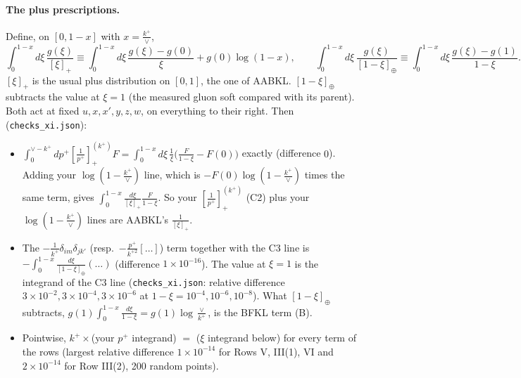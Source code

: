 \documentclass[9pt]{article}
\numberwithin{equation}{section}
\begin{document}
\paragraph{The plus prescriptions.} Define, on $[0,1-x]$ with $x=\frac{k^+}{\vee}$,
\begin{equation}
\int_0^{1-x}\!d\xi\,\frac{g(\xi)}{[\xi]_+}\equiv\int_0^{1-x}\!d\xi\,\frac{g(\xi)-g(0)}{\xi}+g(0)\log(1-x),\qquad
\int_0^{1-x}\!d\xi\,\frac{g(\xi)}{[1-\xi]_\oplus}\equiv\int_0^{1-x}\!d\xi\,\frac{g(\xi)-g(1)}{1-\xi}.
\end{equation}
$[\xi]_+$ is the usual plus distribution on $[0,1]$, the one of AABKL. $[1-\xi]_\oplus$ subtracts the value at $\xi=1$ (the measured gluon soft compared with its parent). Both act at fixed $u,x,x',y,z,w$, on everything to their right. Then (\texttt{checks\_xi.json}):
\begin{itemize}
\item $\int_0^{\vee-k^+}\!dp^+\left[\frac{1}{p^+}\right]_+^{(k^+)}F=\int_0^{1-x}d\xi\,\frac{1}{\xi}\Big(\frac{F}{1-\xi}-F(0)\Big)$ exactly (difference $0$). Adding your $\log(1-\frac{k^+}{\vee})$ line, which is $-F(0)\log(1-\frac{k^+}{\vee})$ times the same term, gives $\int_0^{1-x}\frac{d\xi}{[\xi]_+}\frac{F}{1-\xi}$. So your $\left[\frac{1}{p^+}\right]_+^{(k^+)}$ (C2) plus your $\log(1-\frac{k^+}{\vee})$ lines are AABKL's $\frac{1}{[\xi]_+}$.
\item The $-\frac{1}{k^+}\delta_{im}\delta_{jk'}$ (resp.\ $-\frac{p^+}{k^{+2}}[\dots]$) term together with the C3 line is $-\int_0^{1-x}\frac{d\xi}{[1-\xi]_\oplus}(\dots)$ (difference $1\times10^{-16}$). The value at $\xi=1$ is the integrand of the C3 line (\texttt{checks\_xi.json}: relative difference $3\times10^{-2}, 3\times10^{-4}, 3\times10^{-6}$ at $1-\xi=10^{-4},10^{-6},10^{-8}$). What $[1-\xi]_\oplus$ subtracts, $g(1)\int_0^{1-x}\frac{d\xi}{1-\xi}=g(1)\log\frac{\vee}{k^+}$, is the BFKL term (B).
\item Pointwise, $k^+\times$(your $p^+$ integrand) $=$ ($\xi$ integrand below) for every term of the rows (largest relative difference $1\times10^{-14}$ for Rows V, III(1), VI and $2\times10^{-14}$ for Row III(2), 200 random points).
\end{itemize}
\end{document}
